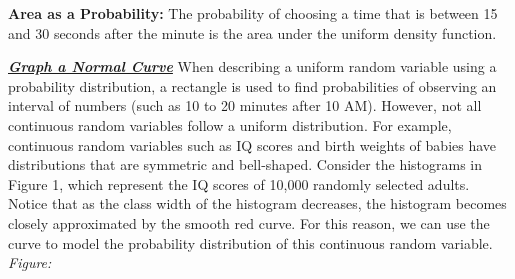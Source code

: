 \documentclass{report}
\begin{document}
    \pagebreak \bigbreak \noindent 
    \textbf{Area as a Probability:}
    \bigbreak \noindent 
    The probability of choosing a time that is between 15 and 30 seconds after the minute is the area under the uniform density function.
    \bigbreak \noindent 
    \begin{figure}[ht]
        \centering
        \label{fig:figaro2}
    \end{figure}

    \bigbreak \noindent \bigbreak \noindent 
    \textbf{\textit{\underline{Graph a Normal Curve}}}
    \bigbreak \noindent 
    When describing a uniform random variable using a probability distribution, a rectangle is used to find probabilities of observing an interval of numbers (such as 10 to 20 minutes after 10 AM). However, not all continuous random variables follow a uniform distribution. For example, continuous random variables such as IQ scores and birth weights of babies have distributions that are symmetric and bell-shaped. Consider the histograms in Figure 1, which represent the IQ scores of 10,000 randomly selected adults. Notice that as the class width of the histogram decreases, the histogram becomes closely approximated by the smooth red curve. For this reason, we can use the curve to model the probability distribution of this continuous random variable.
    \bigbreak \noindent 
    \textit{Figure:}
\begin{figure}[ht]
    \centering
    \label{fig:normalcurve}
\end{figure}
\end{document}
